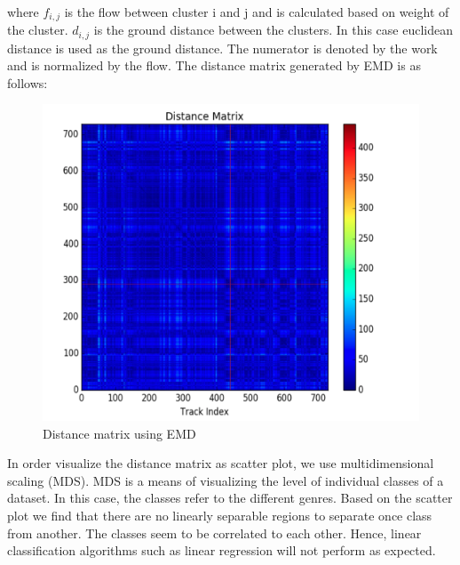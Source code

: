 \documentclass[12pt]{article}
\begin{document}
\paragraph{}
where $f_{i,j}$ is the flow between cluster i and j and is calculated based on weight of the cluster. $d_{i,j}$ is the ground distance between the clusters. In this case euclidean distance is used as the ground distance. The numerator is denoted by the work and is normalized by the flow. The distance matrix generated by EMD is as follows:
\begin{figure}[H]\label{emd_dist}
\center
\includegraphics[scale=0.8]{emd_dist.png}
\caption{Distance matrix using EMD}
\end{figure}
In order visualize the distance matrix as scatter plot, we use multidimensional scaling (MDS). MDS is a means of visualizing the level of individual classes of a dataset. In this case, the classes refer to the different genres. Based on the scatter plot we find that there are no linearly separable regions to separate once class from another. The classes seem to be correlated to each other. Hence, linear classification algorithms such as linear regression will not perform as expected.
\end{document}
